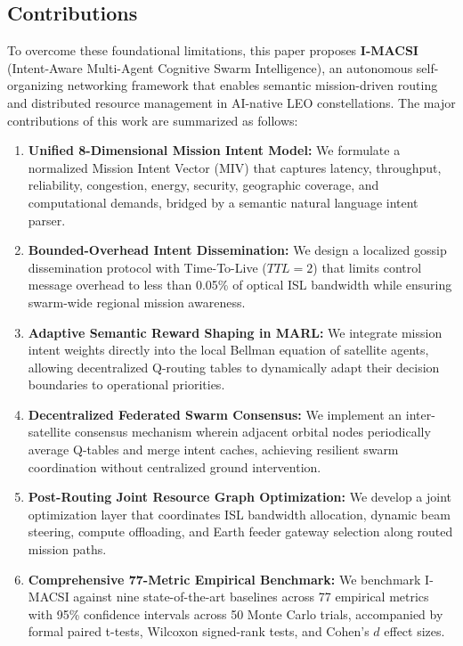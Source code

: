 \documentclass[journal]{IEEEtran}
\begin{document}
\subsection{Contributions}
To overcome these foundational limitations, this paper proposes \textbf{I-MACSI} (Intent-Aware Multi-Agent Cognitive Swarm Intelligence), an autonomous self-organizing networking framework that enables semantic mission-driven routing and distributed resource management in AI-native LEO constellations. The major contributions of this work are summarized as follows:
\begin{enumerate}
    \item \textbf{Unified 8-Dimensional Mission Intent Model:} We formulate a normalized Mission Intent Vector (MIV) that captures latency, throughput, reliability, congestion, energy, security, geographic coverage, and computational demands, bridged by a semantic natural language intent parser.
    \item \textbf{Bounded-Overhead Intent Dissemination:} We design a localized gossip dissemination protocol with Time-To-Live ($TTL = 2$) that limits control message overhead to less than 0.05\% of optical ISL bandwidth while ensuring swarm-wide regional mission awareness.
    \item \textbf{Adaptive Semantic Reward Shaping in MARL:} We integrate mission intent weights directly into the local Bellman equation of satellite agents, allowing decentralized Q-routing tables to dynamically adapt their decision boundaries to operational priorities.
    \item \textbf{Decentralized Federated Swarm Consensus:} We implement an inter-satellite consensus mechanism wherein adjacent orbital nodes periodically average Q-tables and merge intent caches, achieving resilient swarm coordination without centralized ground intervention.
    \item \textbf{Post-Routing Joint Resource Graph Optimization:} We develop a joint optimization layer that coordinates ISL bandwidth allocation, dynamic beam steering, compute offloading, and Earth feeder gateway selection along routed mission paths.
    \item \textbf{Comprehensive 77-Metric Empirical Benchmark:} We benchmark I-MACSI against nine state-of-the-art baselines across 77 empirical metrics with 95\% confidence intervals across 50 Monte Carlo trials, accompanied by formal paired t-tests, Wilcoxon signed-rank tests, and Cohen's $d$ effect sizes.
\end{enumerate}
\end{document}
